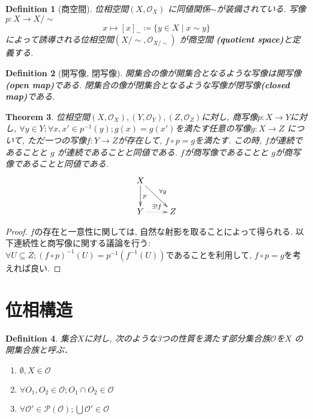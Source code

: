\documentclass[lualatex]{ltjsbook}
\newtheorem{theorem}{Theorem}[chapter]
\newtheorem{definition}[theorem]{Definition}
\theoremstyle{remark}
\theoremstyle{plain}
\begin{document}
\begin{definition}[商空間]
	位相空間$\left( X,  \mathcal{O}_X \right) $ に同値関係$\sim$が装備されている. 
	 写像$p: X \to X / \sim $
      $$
	x \mapsto [x]_{\sim}\coloneqq \{y \in X \mid x \sim y\} 
      $$
      によって誘導される位相空間$\left( X / \sim ,  \mathcal{O}_{X / \sim} \right) $ が商空間 \textbf{(quotient space)}と定義する.
\end{definition}


\begin{definition}[開写像,  閉写像]
開集合の像が開集合となるような写像は開写像\textbf{(open map)}である. 閉集合の像が閉集合となるような写像が閉写像\textbf{(closed map)}である.	
\end{definition}




\begin{theorem}%
	位相空間$\left( X,  \mathcal{O}_X \right) , \left( Y, \mathcal{O}_Y \right) ,  \left( Z ,  \mathcal{O}_Z\right) $に対し,  商写像$p: X \to Y$に対し,  $\forall y \in Y; \forall x , x'\in p ^{-1}({y});g(x)=g(x')$を満たす任意の写像$g: X \to Z$ について,  ただ一つの写像$f: Y\to Z$が存在して,  $f \circ p = g$を満たす. この時,   $f$が連続であることと $g$ が連続であることと同値である. $f$が商写像であることと $g$が商写像であることと同値である.
\[
	\xymatrix{
		X \ar[d]^{p} \ar[rd]^{\forall g} \\
		Y \ar@{..>}[r]^{\exists !f} &Z
	}
\] 		
\end{theorem}

\begin{proof}%
	$f$の存在と一意性に関しては,  自然な射影を取ることによって得られる. 以下連続性と商写像に関する議論を行う:
	 $\forall U \subseteq Z; \left( f\circ p \right) ^{-1}(U) = p^{-1}(f^{-1}(U))$であることを利用して,  $f\circ p =g$を考えれば良い. 
\end{proof}


\section{位相構造}

\begin{definition}
	集合$X$に対し,  次のような3つの性質を満たす部分集合族$\mathcal{O}$を$X$ の開集合族と呼ぶ．
	\begin{enumerate}
		\item $\emptyset ,  X \in \mathcal{O}$ 
	\item $\forall O_1,  O_2 \in  \mathcal{O} ;O_1 \cap O_2 \in \mathcal{O}$ 
		\item $\forall \mathcal{O}' \in \mathcal{P}(\mathcal{O}); \bigcup \mathcal{O}' \in \mathcal{O} $
	\end{enumerate}
\end{definition}
\end{document}
